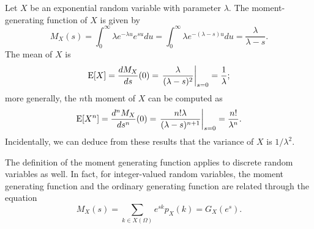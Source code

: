 \begin{example}
Let $X$ be an exponential random variable with parameter $\lambda$.
The moment-generating function of $X$ is given by
\begin{equation*}
M_X (s) = \int_0^{\infty} \lambda e^{-\lambda u} e^{su} du
= \int_0^{\infty} \lambda e^{-(\lambda-s) u} du
= \frac{\lambda}{\lambda - s} .
\end{equation*}
The mean of $X$ is
\begin{equation*}
\mathrm{E} [X] = \frac{d M_X }{ds} (0)
= \left. \frac{\lambda}{(\lambda - s)^2} \right|_{s=0}
= \frac{1}{\lambda} ;
\end{equation*}
more generally, the $n$th moment of $X$ can be computed as
\begin{equation*}
\mathrm{E} [X^n] = \frac{d^n M_X }{ds^n} (0)
= \left. \frac{n! \lambda}{(\lambda - s)^{n+1}} \right|_{s=0}
= \frac{n!}{\lambda^n} .
\end{equation*}
Incidentally, we can deduce from these results that the variance of $X$ is $1/\lambda^2$.
\end{example}

The definition of the moment generating function applies to discrete random variables as well.
In fact, for integer-valued random variables, the moment generating function and the ordinary generating function are related through the equation  
\begin{equation*}
M_X (s) = \sum_{k \in X(\Omega)} e^{sk} p_X(k) = G_X (e^s) .
\end{equation*}

